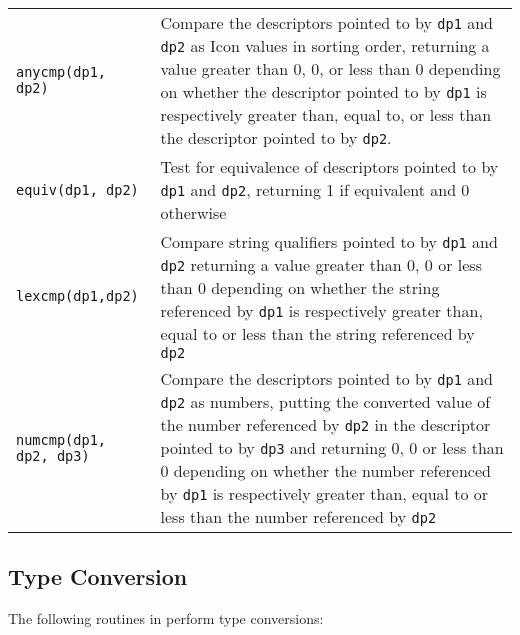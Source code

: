 \begin{xtabular}{l@{\hspace{1cm}}p{11cm}}

\texttt{anycmp(dp1, dp2)} &
Compare the descriptors pointed to by \texttt{dp1} and \texttt{dp2} as Icon
values in sorting order, returning a value greater than 0, 0, or less than 0
depending on whether the descriptor pointed to by \texttt{dp1} is respectively greater
than, equal to, or less than the descriptor pointed to by \texttt{dp2}.\\

\texttt{equiv(dp1, dp2)} &
Test for equivalence of descriptors pointed to by \texttt{dp1} and \texttt{dp2},
returning 1 if equivalent and 0 otherwise\\

\texttt{lexcmp(dp1,dp2)} &
Compare string qualifiers pointed to by \texttt{dp1} and \texttt{dp2} returning
a value greater than 0, 0 or less than 0 depending on whether the string
referenced by \texttt{dp1} is respectively greater than, equal to or less than
the string referenced by \texttt{dp2}\\

\texttt{numcmp(dp1, dp2, dp3)} &
Compare the descriptors pointed to by \texttt{dp1} and \texttt{dp2} as numbers,
putting the converted value of the number referenced by \texttt{dp2} in the
descriptor pointed to by \texttt{dp3} and returning 0, 0 or less than 0
depending on whether the number referenced by \texttt{dp1} is respectively
greater than, equal to or less than the number referenced by \texttt{dp2}\\

\end{xtabular}

\subsection{Type Conversion}

The following routines in  perform type conversions:

